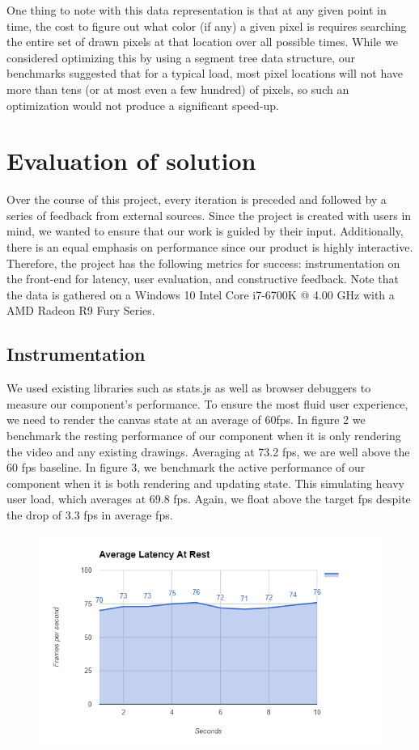 \documentclass[conference]{IEEEtran}
\begin{document}
    One thing to note with this data representation is that at any given point in time, the cost to figure out what color (if any) a given pixel is requires searching the entire set of drawn pixels at that location over all possible times. While we considered optimizing this by using a segment tree data structure, our benchmarks suggested that for a typical load, most pixel locations will not have more than tens (or at most even a few hundred) of pixels, so such an optimization would not produce a significant speed-up.

\section{Evaluation of solution}
    Over the course of this project, every iteration is preceded and followed by a series of feedback from external sources. Since the project is created with users in mind, we wanted to ensure that our work is guided by their input. Additionally, there is an equal emphasis on performance since our product is highly interactive. Therefore, the project has the following metrics for success: instrumentation on the front-end for latency, user evaluation, and constructive feedback. Note that the data is gathered on a Windows 10 Intel Core i7-6700K @ 4.00 GHz with a AMD Radeon R9 Fury Series.



\subsection{Instrumentation}
    We used existing libraries such as stats.js as well as browser debuggers to measure our component's performance. To ensure the most fluid user experience, we need to render the canvas state at an average of 60fps. In figure 2 we benchmark the resting performance of our component when it is only rendering the video and any existing drawings. Averaging at 73.2 fps, we are well above the 60 fps baseline. In figure 3, we benchmark the active performance of our component when it is both rendering and updating state. This simulating heavy user load, which averages at 69.8 fps. Again, we float above the target fps despite the drop of 3.3 fps in average fps.

    \begin{figure}[H]
      \centering
      \includegraphics[width=\linewidth]{figure2a.PNG}
      \caption{}
      \label{fig:my_label}
    \end{figure}
\end{document}
